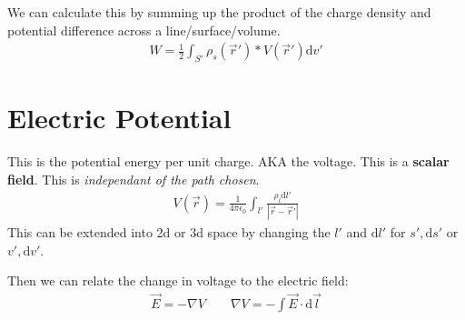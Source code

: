 \documentclass[12pt,letterpaper]{article} \usepackage{amsmath} \usepackage{graphicx} \usepackage[margin=1in]{geometry} \usepackage{longtable}  \usepackage{amssymb}
\begin{document}
	We can calculate this by summing up the product of the charge density and potential difference across a line/surface/volume.
	\begin{align*}
		W = \frac{1}{2}\int_{S\prime}\rho_s(\vec r\prime)*V(\vec r\prime) \mathrm d v\prime
	\end{align*}
	
	\section{Electric Potential}
	This is the potential energy per unit charge. AKA the voltage. This is a \textbf{scalar field}. This is \textit{independant of the path chosen}. 
	\begin{align*}
		V(\vec r) = \frac{1}{4\pi \epsilon _0} \int_{l\prime }\frac{\rho _l \mathrm d l\prime}{|\vec r-\vec r\prime| }
	\end{align*}
	This can be extended into 2d or 3d space by changing the $l\prime$ and $\mathrm d l\prime$ for $s\prime, \mathrm d s\prime$ or $v\prime, \mathrm d v\prime$.
	
	Then we can relate the change in voltage to the electric field:
	\begin{align*}
		\vec E = -\nabla V \qquad \nabla V = -\int \vec E\cdot \mathrm d \vec l
	\end{align*}
	
\end{document}
